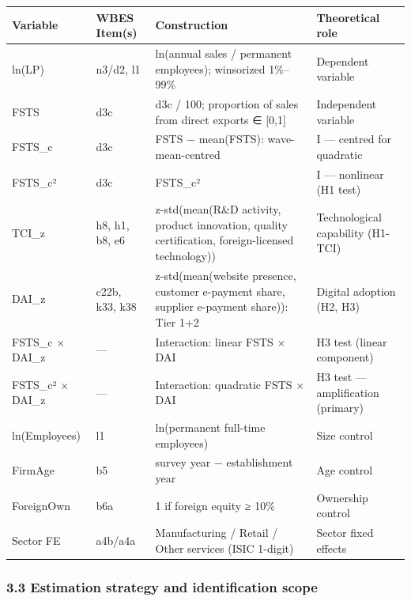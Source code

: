 \documentclass[12pt,a4paper]{article}
\begin{document}
\begin{longtable}[]{@{}llll@{}}
\toprule\noalign{}
Variable & WBES Item(s) & Construction & Theoretical role \\
\midrule\noalign{}
\endhead
\bottomrule\noalign{}
\endlastfoot
ln(LP) & n3/d2, l1 & ln(annual sales / permanent employees); winsorized
1\%--99\% & Dependent variable \\
FSTS & d3c & d3c / 100; proportion of sales from direct exports ∈
{[}0,1{]} & Independent variable \\
FSTS\_c & d3c & FSTS − mean(FSTS): wave-mean-centred & I --- centred for
quadratic \\
FSTS\_c² & d3c & FSTS\_c² & I --- nonlinear (H1 test) \\
TCI\_z & h8, h1, b8, e6 & z-std(mean(R\&D activity, product innovation,
quality certification, foreign-licensed technology)) & Technological
capability (H1-TCI) \\
DAI\_z & c22b, k33, k38 & z-std(mean(website presence, customer
e-payment share, supplier e-payment share)): Tier 1+2 & Digital adoption
(H2, H3) \\
FSTS\_c × DAI\_z & --- & Interaction: linear FSTS × DAI & H3 test
(linear component) \\
FSTS\_c² × DAI\_z & --- & Interaction: quadratic FSTS × DAI & H3 test
--- amplification (primary) \\
ln(Employees) & l1 & ln(permanent full-time employees) & Size control \\
FirmAge & b5 & survey year − establishment year & Age control \\
ForeignOwn & b6a & 1 if foreign equity ≥ 10\% & Ownership control \\
Sector FE & a4b/a4a & Manufacturing / Retail / Other services (ISIC
1-digit) & Sector fixed effects \\
\end{longtable}

\hypertarget{33-estimation-strategy-and-identification-scope}{%
\subsubsection{3.3 Estimation strategy and identification
scope}\label{33-estimation-strategy-and-identification-scope}}
\end{document}
